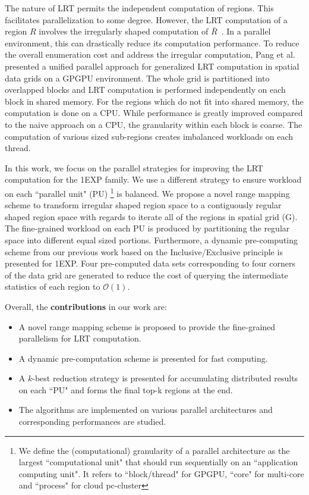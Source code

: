 \documentclass[AMA,LATO1COL]{WileyNJD-v2}
\newcommand\bigo{\mathcal O}
\begin{document}
\noindent The nature of LRT permits the independent computation of regions. This facilitates parallelization to some degree. However, the LRT computation of a region $R$ involves the irregularly shaped computation of $\bar R$~\cite{apweb}. In a parallel environment, this can drastically reduce its computation performance\cite{irregular1,irregular2,irregular3}.
To reduce the overall enumeration cost and address the irregular computation, Pang et al.~\cite{apweb} presented a unified parallel approach for generalized LRT computation in spatial data grids on a GPGPU environment. The whole grid is partitioned into overlapped blocks and LRT computation is performed independently on each block in shared memory. For the regions which do not fit into shared memory, the computation is done on a CPU. While performance is greatly improved compared to the naive approach on a CPU, the granularity within each block is coarse. The computation of various sized sub-regions creates imbalanced workloads on each thread.

\noindent In this work, we focus on the parallel strategies for improving the LRT computation for the 1EXP family. We use a different strategy to ensure workload on each ``parallel unit" (PU) \footnote{We define the (computational) granularity of a parallel architecture as the largest ``computational unit" that should run sequentially on an ``application computing unit". It refers to ``block/thread" for GPGPU, ``core" for multi-core and ``process" for cloud pc-cluster} is balanced. We propose a novel range mapping scheme to transform irregular shaped region space to a contiguously regular shaped region space with regards to iterate all of the regions in spatial grid (G). The fine-grained workload on each PU is produced by partitioning the regular space into different equal sized portions. Furthermore, a dynamic pre-computing scheme from our previous work\cite{apweb} based on the Inclusive/Exclusive principle is presented for 1EXP. Four pre-computed data sets corresponding to four corners of the data grid are generated to reduce the cost of querying the intermediate statistics of each region to $\bigo(1)$.

Overall, the {\bf contributions} in our work are:
\begin{itemize}
\renewcommand{\labelitemi}{$\bullet$}
\item A novel range mapping scheme is proposed to provide the fine-grained parallelism for LRT computation.
\item A dynamic pre-computation scheme is presented for fast computing.
\item A $k$-best reduction strategy is presented for accumulating distributed results on each ``PU" and forms the final top-k regions at the end.
\item The algorithms are implemented on various parallel architectures and corresponding performances are studied.
\end{itemize}
\end{document}
